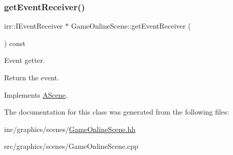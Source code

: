\subsubsection{\texorpdfstring{get\+Event\+Receiver()}{getEventReceiver()}}
{\footnotesize\ttfamily irr\+::\+I\+Event\+Receiver $\ast$ Game\+Online\+Scene\+::get\+Event\+Receiver (\begin{DoxyParamCaption}{ }\end{DoxyParamCaption}) const\hspace{0.3cm}{\ttfamily [virtual]}}



Event getter. 

Return the event. 

Implements \hyperlink{classAScene_af521e5e6d30a5d2e5d30eb333e4d3abd}{A\+Scene}.



The documentation for this class was generated from the following files\+:\begin{DoxyCompactItemize}
\item 
inc/graphics/scenes/\hyperlink{GameOnlineScene_8hh}{Game\+Online\+Scene.\+hh}\item 
src/graphics/scenes/Game\+Online\+Scene.\+cpp\end{DoxyCompactItemize}
